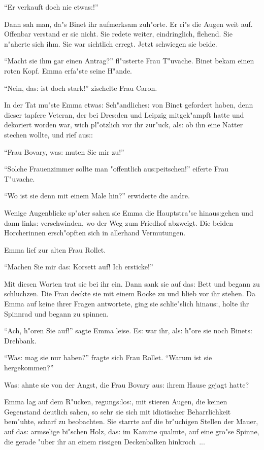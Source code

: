 \documentclass[oneside,12pt]{book}
\newcommand{\s}{s:}%
\begin{document}
"`Er verkauft doch nie etwa{\s}!"'

Dann sah man, da"s Binet ihr aufmerksam zuh"orte. Er ri"s die
Augen weit auf. Offenbar verstand er sie nicht. Sie redete weiter,
eindringlich, flehend. Sie n"aherte sich ihm. Sie war sichtlich
erregt. Jetzt schwiegen sie beide.

"`Macht sie ihm gar einen Antrag?"' fl"usterte Frau T"uvache.
Binet bekam einen roten Kopf. Emma erfa"ste seine H"ande.

"`Nein, da{\s} ist doch stark!"' zischelte Frau Caron.

In der Tat mu"ste Emma etwa{\s} Sch"andliche{\s} von Binet
gefordert haben, denn dieser tapfere Veteran, der bei Dre{\s}den
und Leipzig mitgek"ampft hatte und dekoriert worden war, wich
pl"otzlich vor ihr zur"uck, al{\s} ob ihn eine Natter stechen
wollte, und rief au{\s}:

"`Frau Bovary, wa{\s} muten Sie mir zu!"'

"`Solche Frauenzimmer sollte man "offentlich au{\s}peitschen!"' eiferte
Frau T"uvache.

"`Wo ist sie denn mit einem Male hin?"' erwiderte die andre.

Wenige Augenblicke sp"ater sahen sie Emma die Hauptstra"se
hinau{\s}gehen und dann link{\s} verschwinden, wo der Weg zum
Friedhof abzweigt. Die beiden Horcherinnen ersch"opften sich in
allerhand Vermutungen.

Emma lief zur alten Frau Rollet.

"`Machen Sie mir da{\s} Korsett auf! Ich ersticke!"'

Mit diesen Worten trat sie bei ihr ein. Dann sank sie auf da{\s}
Bett und begann zu schluchzen. Die Frau deckte sie mit einem Rocke
zu und blieb vor ihr stehen. Da Emma auf keine ihrer Fragen
antwortete, ging sie schlie"slich hinau{\s}, holte ihr Spinnrad
und begann zu spinnen.

"`Ach, h"oren Sie auf!"' sagte Emma leise. E{\s} war ihr, al{\s}
h"ore sie noch Binet{\s} Drehbank.

"`Wa{\s} mag sie nur haben?"' fragte sich Frau Rollet. "`Warum ist
sie hergekommen?"'

Wa{\s} ahnte sie von der Angst, die Frau Bovary au{\s} ihrem Hause
gejagt hatte?

Emma lag auf dem R"ucken, regung{\s}lo{\s}, mit stieren Augen, die
keinen Gegenstand deutlich sahen, so sehr sie sich mit idiotischer
Beharrlichkeit bem"uhte, scharf zu beobachten. Sie starrte auf die
br"uchigen Stellen der Mauer, auf da{\s} armselige bi"schen Holz,
da{\s} im Kamine qualmte, auf eine gro"se Spinne, die gerade "uber
ihr an einem rissigen Deckenbalken hinkroch~...
\end{document}
